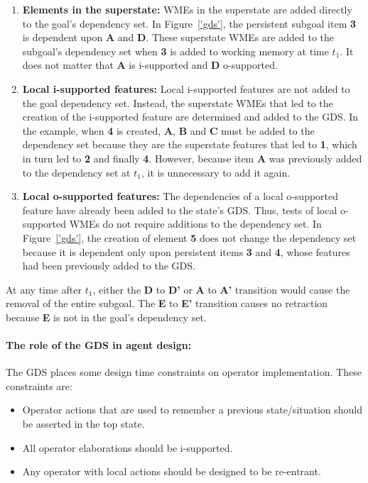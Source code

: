 \vspace{-10pt}
\begin{enumerate}
	\item \textbf{Elements in the superstate:}
		WMEs in the superstate are added directly to the goal's dependency set. In Figure~\ref{'gds'}, the persistent subgoal item {\bf 3} is dependent upon {\bf A} and {\bf D}. These superstate WMEs are added to the subgoal's dependency set when {\bf 3} is added to working memory at time $t_1$. It does not matter that {\bf A} is i-supported and {\bf D} o-supported.
	\item \textbf{Local i-supported features:}
		Local i-supported features are not added to the goal dependency set.  Instead, the superstate WMEs that led to the creation of the i-supported feature are determined and added to the GDS. In the example, when {\bf 4} is created, {\bf A}, {\bf B} and {\bf C} must be added to the dependency set because they are the superstate features that led to {\bf 1}, which in turn led to {\bf 2} and finally {\bf 4}. However, because item {\bf A} was previously added to the dependency set at $t_1$, it is unnecessary to add it again.
	\item \textbf{Local o-supported features:}
		The dependencies of a local o-supported feature have already been added to the state's GDS. Thus, tests of local o-supported WMEs do not require additions to the dependency set. In Figure~\ref{'gds'}, the creation of element {\bf 5} does not change the dependency set because it is dependent only upon persistent items {\bf 3} and {\bf 4}, whose features had been previously added to the GDS.
\end{enumerate}

At any time after $t_1$, either the {\bf D} to {\bf D'} or {\bf A} to {\bf A'} transition would cause the removal of the entire subgoal. The {\bf E} to {\bf E'} transition causes no retraction because {\bf E} is not in the goal's dependency set.

\paragraph{The role of the GDS in agent design:}

The GDS places some design time constraints on operator implementation. These constraints are:

\vspace{-10pt}
\begin{itemize}
	\item Operator actions that are used to remember a previous state/situation should be asserted in the top state.
	\vspace{-8pt}
	\item All operator elaborations should be i-supported.
	\vspace{-8pt}
	\item Any operator with local actions should be designed to be re-entrant.
\end{itemize}

